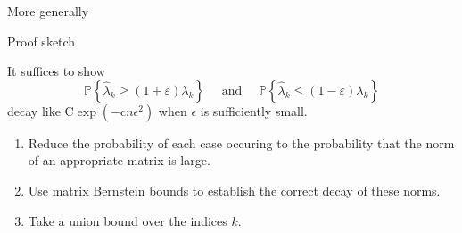\documentclass[xcolor={svgnames,pdftex,dvipsnames,table},10pt]{beamer} %
\newcommand{\mat}[1]{\ensuremath{\mathbf{#1}}}
\newcommand{\Prob}[1]{\ensuremath{\mathbb{P}\left\{#1 \right\}}}
\begin{document}
\begin{frame}{More generally}
%
%
%
\end{frame}

\begin{frame}{Proof sketch}

It suffices to show
\[
 \textstyle \Prob{\hat{\lambda}_k \geq (1+\varepsilon) \lambda_k } \quad \text{ and } \quad \Prob{\hat{\lambda}_k \leq (1-\varepsilon) \lambda_k}
\]
decay like $\mathrm{C} \exp(-\mathrm{c} n \epsilon^2)$ when $\epsilon$ is sufficiently small.

\pause
\begin{enumerate}
		
	\item Reduce the probability of each case occuring to the probability that the norm of an appropriate matrix is large.

	\pause
	
	\item Use matrix Bernstein bounds to establish the correct decay of these norms. 

	\pause
	
	\item Take a union bound over the indices $k.$ 
 \end{enumerate}
 
\end{frame}
\end{document}
